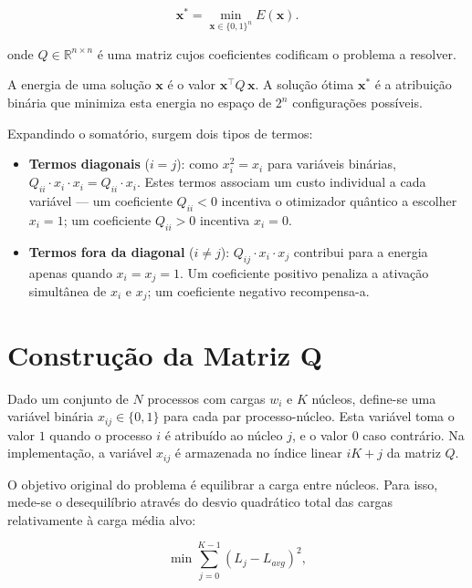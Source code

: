 \begin{equation}
    \mathbf{x}^* = \min_{\mathbf{x} \in \{0,1\}^n} E(\mathbf{x}).
\end{equation}

onde $Q \in \mathbb{R}^{n \times n}$ é uma matriz cujos coeficientes codificam o problema a resolver.

A energia de uma solução $\mathbf{x}$ é o valor $\mathbf{x}^\top Q\, \mathbf{x}$.
A solução ótima $\mathbf{x}^*$ é a atribuição binária que minimiza esta energia no espaço de
$2^n$ configurações possíveis.

Expandindo o somatório, surgem dois tipos de termos:

\begin{itemize}
    \item \textbf{Termos diagonais} ($i = j$): como $x_i^2 = x_i$ para variáveis binárias,
    $Q_{ii} \cdot x_i \cdot x_i = Q_{ii} \cdot x_i$. Estes termos associam um custo individual
    a cada variável --- um coeficiente $Q_{ii} < 0$ incentiva o otimizador quântico a escolher $x_i = 1$; um coeficiente
    $Q_{ii} > 0$ incentiva $x_i = 0$.

    \item \textbf{Termos fora da diagonal} ($i \neq j$): $Q_{ij} \cdot x_i \cdot x_j$ contribui
    para a energia apenas quando $x_i = x_j = 1$. Um coeficiente positivo penaliza a ativação
    simultânea de $x_i$ e $x_j$; um coeficiente negativo recompensa-a.
\end{itemize}

\section{Construção da Matriz Q}
\label{sec:construcao-matriz-q}

Dado um conjunto de $N$ processos com cargas $w_i$ e $K$ núcleos, define-se uma
variável binária $x_{ij} \in \{0,1\}$ para cada par processo-núcleo. Esta variável
toma o valor $1$ quando o processo $i$ é atribuído ao núcleo $j$, e o valor $0$
caso contrário.
Na implementação, a variável $x_{ij}$ é armazenada no índice linear $iK+j$ da matriz $Q$.

O objetivo original do problema é equilibrar a carga entre núcleos. Para isso,
mede-se o desequilíbrio através do desvio quadrático total das cargas relativamente
à carga média alvo:

\begin{equation}
    \min \sum_{j=0}^{K-1}(L_j - L_{avg})^2,
\end{equation}

